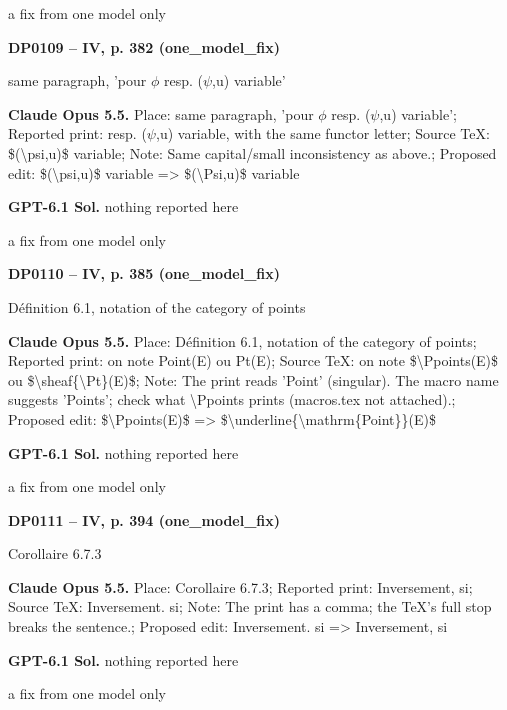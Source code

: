a fix from one model only\par
\par\noindent\hypertarget{DP0109}{}\textbf{DP0109 -- IV, p. 382 (one\_model\_fix)}\par
same paragraph, 'pour \ensuremath{\phi} resp. (\ensuremath{\psi},u) variable'\par
\textbf{Claude Opus 5.5.} Place: same paragraph, 'pour \ensuremath{\phi} resp. (\ensuremath{\psi},u) variable'; Reported print: resp. (\ensuremath{\psi},u) variable, with the same functor letter; Source TeX: \$(\textbackslash{}psi,u)\$ variable; Note: Same capital/small inconsistency as above.; Proposed edit: \$(\textbackslash{}psi,u)\$ variable =\allowbreak > \$(\textbackslash{}Psi,u)\$ variable\par
\textbf{GPT-6.1 Sol.} nothing reported here\par
a fix from one model only\par
\par\noindent\hypertarget{DP0110}{}\textbf{DP0110 -- IV, p. 385 (one\_model\_fix)}\par
Définition 6.1, notation of the category of points\par
\textbf{Claude Opus 5.5.} Place: Définition 6.1, notation of the category of points; Reported print: on note Point(E) ou Pt(E); Source TeX: on note \$\textbackslash{}Ppoints(E)\$ ou \$\textbackslash{}sheaf\{\textbackslash{}Pt\}(E)\$; Note: The print reads 'Point' (singular). The macro name suggests 'Points'; check what \textbackslash{}Ppoints prints (macros.tex not attached).; Proposed edit: \$\textbackslash{}Ppoints(E)\$ =\allowbreak > \$\textbackslash{}underline\{\textbackslash{}mathrm\{Point\}\}(E)\$\par
\textbf{GPT-6.1 Sol.} nothing reported here\par
a fix from one model only\par
\par\noindent\hypertarget{DP0111}{}\textbf{DP0111 -- IV, p. 394 (one\_model\_fix)}\par
Corollaire 6.7.3\par
\textbf{Claude Opus 5.5.} Place: Corollaire 6.7.3; Reported print: Inversement, si; Source TeX: Inversement. si; Note: The print has a comma; the TeX's full stop breaks the sentence.; Proposed edit: Inversement. si =\allowbreak > Inversement, si\par
\textbf{GPT-6.1 Sol.} nothing reported here\par
a fix from one model only\par
